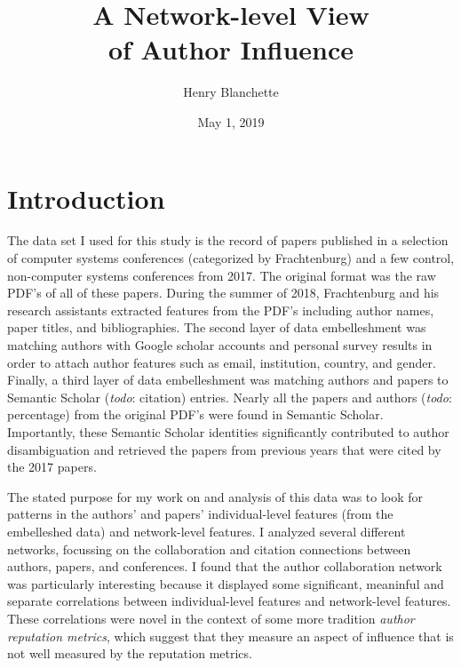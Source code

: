 \documentclass{article}
\title{\sc A Network-level View \\ of Author Influence}
\author{Henry Blanchette}
\date{May 1, 2019}
\newcommand{\todo}[1]{\textit{todo}: #1}
\renewcommand{\it}{\textit}
\begin{document}

\maketitle


\section{Introduction}
\label{sec:introduction}

The data set I used for this study is the record of papers published in a selection of computer systems conferences (categorized by Frachtenburg) and a few control, non-computer systems conferences from 2017.
The original format was the raw PDF's of all of these papers.
During the summer of 2018, Frachtenburg and his research assistants extracted features from the PDF's including author names, paper titles, and bibliographies.
The second layer of data embelleshment was matching authors with Google scholar accounts and personal survey results in order to attach author features such as email, institution, country, and gender.
Finally, a third layer of data embelleshment was matching authors and papers to Semantic Scholar (\todo{citation}) entries.
Nearly all the papers and authors (\todo{percentage}) from the original PDF's were found in Semantic Scholar.
Importantly, these Semantic Scholar identities significantly contributed to author disambiguation and retrieved the papers from previous years that were cited by the 2017 papers.

The stated purpose for my work on and analysis of this data was to look for patterns in the authors' and papers' individual-level features (from the embelleshed data) and network-level features.
I analyzed several different networks, focussing on the collaboration and citation connections between authors, papers, and conferences.
I found that the author collaboration network was particularly interesting because it displayed some significant, meaninful and separate correlations between individual-level features and network-level features.
These correlations were novel in the context of some more tradition \it{author reputation metrics}, which suggest that they measure an aspect of influence that is not well measured by the reputation metrics.
\end{document}
